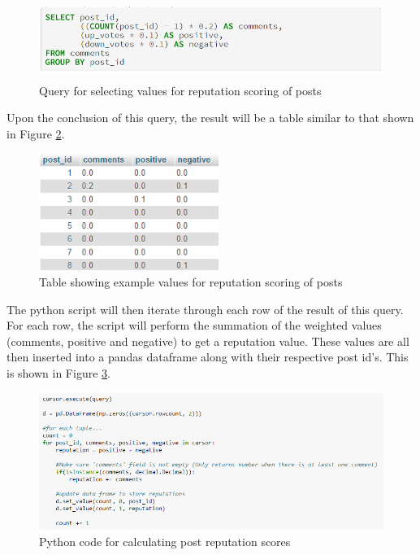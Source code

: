 \begin{figure}[H]
\centering
\includegraphics[height=1in]{Images/Implementation/PostRepQuery}
\caption{Query for selecting values for reputation scoring of posts}
\label{fig:PostRepQuery}
\end{figure}

Upon the conclusion of this query, the result will be a table similar to that shown in Figure \ref{fig:PostRepTable}.

\begin{figure}[H]
\centering
\includegraphics[height=1.5in]{Images/Implementation/PostRepTable}
\caption{Table showing example values for reputation scoring of posts}
\label{fig:PostRepTable}
\end{figure}

The python script will then iterate through each row of the result of this query. For each row, the script will perform the summation of the weighted values (comments, positive and negative) to get a reputation value. These values are all then inserted into a pandas dataframe \cite{Pandas} along with their respective post id's. This is shown in Figure \ref{fig:PostRepPython1}.

\begin{figure}[H]
\centering
\includegraphics[width=5in]{Images/Implementation/PostRepPython1}
\caption{Python code for calculating post reputation scores}
\label{fig:PostRepPython1}
\end{figure}

